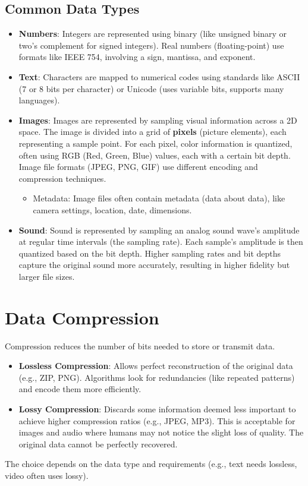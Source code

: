 \documentclass[11pt,oneside]{book}
\begin{document}
\subsection*{Common Data Types}
\begin{itemize}
    \item \textbf{Numbers}: Integers are represented using binary (like unsigned binary or two's complement for signed integers). Real numbers (floating-point) use formats like IEEE 754, involving a sign, mantissa, and exponent.
    \item \textbf{Text}: Characters are mapped to numerical codes using standards like ASCII (7 or 8 bits per character) or Unicode (uses variable bits, supports many languages).
    \item \textbf{Images}: Images are represented by sampling visual information across a 2D space. The image is divided into a grid of \textbf{pixels} (picture elements), each representing a sample point. For each pixel, color information is quantized, often using RGB (Red, Green, Blue) values, each with a certain bit depth. Image file formats (JPEG, PNG, GIF) use different encoding and compression techniques.
        \begin{itemize}
            \item Metadata: Image files often contain metadata (data about data), like camera settings, location, date, dimensions.
        \end{itemize}
    \item \textbf{Sound}: Sound is represented by sampling an analog sound wave's amplitude at regular time intervals (the sampling rate). Each sample's amplitude is then quantized based on the bit depth. Higher sampling rates and bit depths capture the original sound more accurately, resulting in higher fidelity but larger file sizes.
\end{itemize}

\section{Data Compression}
\label{sec:data_compression}
Compression reduces the number of bits needed to store or transmit data.
\begin{itemize}
    \item \textbf{Lossless Compression}: Allows perfect reconstruction of the original data (e.g., ZIP, PNG). Algorithms look for redundancies (like repeated patterns) and encode them more efficiently.
    \item \textbf{Lossy Compression}: Discards some information deemed less important to achieve higher compression ratios (e.g., JPEG, MP3). This is acceptable for images and audio where humans may not notice the slight loss of quality. The original data cannot be perfectly recovered.
\end{itemize}
The choice depends on the data type and requirements (e.g., text needs lossless, video often uses lossy).
\end{document}
